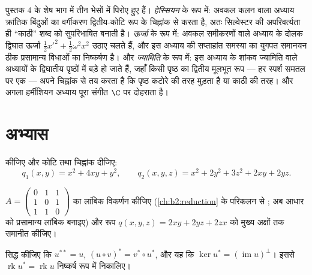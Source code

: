 \begin{remark}[इसी खंड के भीतर के परिप्रेक्ष्य]
 पुस्तक 4 के शेष भाग में तीन भेसों में पिरोए हुए हैं।
\emph{हेस्सियन} के रूप में: अवकल कलन वाला अध्याय क्रांतिक बिंदुओं का
वर्गीकरण द्वितीय-कोटि रूप के चिह्नांक से करता है, अतः सिल्वेस्टर की
अपरिवर्त्यता ही ``काठी'' शब्द को सुपरिभाषित बनाती है। \emph{ऊर्जा} के रूप
में: अवकल समीकरणों वाले अध्याय के दोलक द्विघात ऊर्जा $\frac12x'^2 + \frac12\omega^2x^2$ उठाए चलते हैं,
और इस अध्याय की सप्ताहांत समस्या का युगपत समानयन ठीक प्रसामान्य विधाओं का
निष्कर्षण है। और \emph{ज्यामिति} के रूप में: इस अध्याय के शांकव ज्यामिति
वाले अध्यायों के द्विघातीय पृष्ठों में बड़े हो जाते हैं, जहाँ किसी पृष्ठ
का द्वितीय मूलभूत रूप --- हर स्पर्श समतल पर एक  --- अपने
चिह्नांक से तय करता है कि पृष्ठ कटोरे की तरह मुड़ता है या काठी की तरह।
और अगला हर्मीशियन अध्याय पूरा संगीत $\C$ पर दोहराता है।
\end{remark}

\section{अभ्यास}

\begin{exercise}[$\star$]\label{exo:b2:quadratic:1}
 कीजिए और कोटि तथा चिह्नांक दीजिए:
\[
q_1(x,y) = x^2 + 4xy + y^2,
\qquad
q_2(x,y,z) = x^2 + 2y^2 + 3z^2 + 2xy + 2yz .
\]
\end{exercise}

\begin{exercise}[$\star$]\label{exo:b2:quadratic:2}
$A = \begin{pmatrix} 0 & 1 & 1\\ 1 & 0 &
1\\ 1 & 1 & 0\end{pmatrix}$ का लांबिक विकर्णन कीजिए (\cref{ch:b2:reduction} के परिकलन से ; अब आधार को
प्रसामान्य लांबिक बनाइए) और रूप $q(x,y,z) = 2xy + 2yz + 2zx$ को मुख्य अक्षों तक समानीत कीजिए।
\end{exercise}

\begin{exercise}[$\star$]\label{exo:b2:quadratic:3}
सिद्ध कीजिए कि $u^{**} = u$, $(u \circ v)^* = v^* \circ u^*$, और यह कि $\ker u^* = (\operatorname{im} u)^{\perp}$। इससे $\operatorname{rk} u^* = \operatorname{rk} u$ निष्कर्ष रूप में निकालिए।
\end{exercise}

